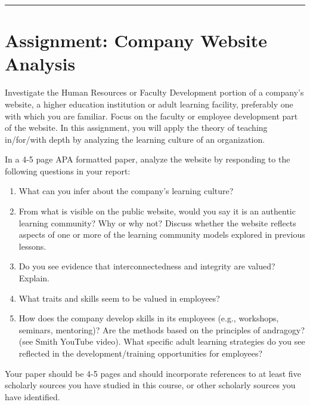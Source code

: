 \documentclass[
]{book}
\providecommand{\tightlist}{%
  \setlength{\itemsep}{0pt}\setlength{\parskip}{0pt}}
\begin{document}
\begin{center}\rule{0.5\linewidth}{0.5pt}\end{center}

\hypertarget{assignment-company-website-analysis}{%
\section*{Assignment: Company Website Analysis}\label{assignment-company-website-analysis}}

\begin{assessment}
Investigate the Human Resources or Faculty Development portion of a
company's website, a higher education institution or adult learning
facility, preferably one with which you are familiar. Focus on the
faculty or employee development part of the website. In this assignment,
you will apply the theory of teaching in/for/with depth by analyzing the
learning culture of an organization.

In a 4-5 page APA formatted paper, analyze the website by responding to
the following questions in your report:

\begin{enumerate}
\def\labelenumi{\arabic{enumi}.}
\tightlist
\item
  What can you infer about the company's learning culture?\\
\item
  From what is visible on the public website, would you say it is an
  authentic learning community? Why or why not? Discuss whether the
  website reflects aspects of one or more of the learning community
  models explored in previous lessons.\\
\item
  Do you see evidence that interconnectedness and integrity are valued?
  Explain.\\
\item
  What traits and skills seem to be valued in employees?\\
\item
  How does the company develop skills in its employees (e.g., workshops,
  seminars, mentoring)? Are the methods based on the principles of
  andragogy? (see Smith YouTube video). What specific adult learning
  strategies do you see reflected in the development/training
  opportunities for employees?
\end{enumerate}

Your paper should be 4-5 pages and should incorporate references to at
least five scholarly sources you have studied in this course, or other
scholarly sources you have identified.


\end{assessment}
\end{document}
